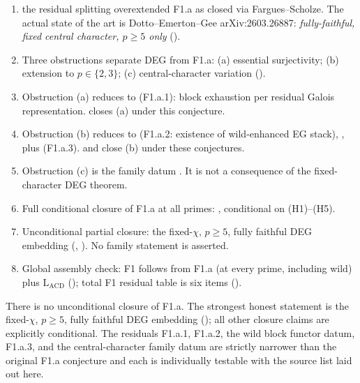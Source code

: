\begin{enumerate}
\item the residual splitting overextended F1.a as closed via Fargues--Scholze. The
actual state of the art is Dotto--Emerton--Gee arXiv:2603.26887:
\emph{fully-faithful, fixed central character, \(p\geq 5\) only}
().
\item Three obstructions separate DEG from F1.a:
(a) essential surjectivity; (b) extension to \(p\in\{2,3\}\);
(c) central-character variation
().
\item Obstruction (a) reduces to
 (F1.a.1): block
exhaustion per residual Galois representation.
 closes (a) under
this conjecture.
\item Obstruction (b) reduces to
 (F1.a.2: existence
of wild-enhanced EG stack),
, plus
 (F1.a.3).
 and
 close (b) under these
conjectures.
\item Obstruction (c) is the family datum
.  It is not a
consequence of the fixed-character DEG theorem.
\item Full conditional closure of F1.a at all primes:
, conditional on
(H1)--(H5).
\item Unconditional partial closure: the fixed-\(\chi\), \(p\geq 5\),
fully faithful DEG embedding
(,
). No family
statement is asserted.
\item Global assembly check: F1 follows from F1.a (at every prime,
including wild) plus \(\mathrm{L}_{\mathrm{ACD}}\)
(); total F1 residual
table is six items
().
\end{enumerate}

There is no unconditional closure of F1.a. The
strongest honest statement is the fixed-\(\chi\), \(p\geq 5\), fully
faithful DEG embedding
(); all other closure
claims are explicitly conditional. The residuals F1.a.1, F1.a.2,
the wild block functor datum, F1.a.3, and the central-character
family datum are strictly narrower than the original F1.a conjecture
and each is individually testable with the source list laid out
here.

